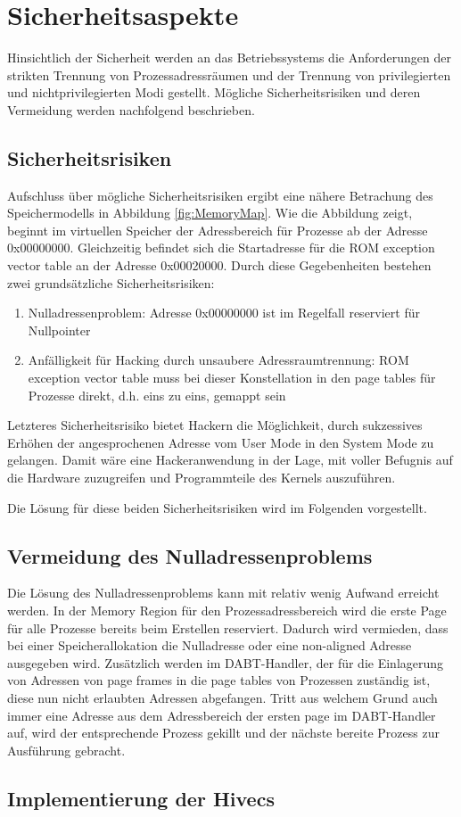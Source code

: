 \section{Sicherheitsaspekte}

Hinsichtlich der Sicherheit werden an das Betriebssystems die Anforderungen der strikten Trennung von Prozessadressräumen und der Trennung von privilegierten und nichtprivilegierten Modi gestellt. Mögliche Sicherheitsrisiken und deren Vermeidung werden nachfolgend beschrieben.

 

\subsection{Sicherheitsrisiken}

Aufschluss über mögliche Sicherheitsrisiken ergibt eine nähere Betrachung des Speichermodells in Abbildung \ref{fig:MemoryMap}. Wie die Abbildung zeigt, beginnt im virtuellen Speicher der Adressbereich für Prozesse ab der Adresse 0x00000000. Gleichzeitig befindet sich die Startadresse für die ROM exception vector table an der Adresse 0x00020000. Durch diese Gegebenheiten bestehen zwei grundsätzliche Sicherheitsrisiken:

\begin{enumerate}
	\item Nulladressenproblem: Adresse 0x00000000 ist im Regelfall reserviert für Nullpointer
	\item Anfälligkeit für Hacking durch unsaubere Adressraumtrennung: ROM exception vector table muss bei dieser Konstellation in den page tables für Prozesse direkt, d.h. eins zu eins, gemappt sein
\end{enumerate}

Letzteres Sicherheitsrisiko bietet Hackern die Möglichkeit, durch sukzessives Erhöhen der angesprochenen Adresse vom User Mode in den System Mode zu gelangen. Damit wäre eine Hackeranwendung in der Lage, mit voller Befugnis auf die Hardware zuzugreifen und Programmteile des Kernels auszuführen.

Die Lösung für diese beiden Sicherheitsrisiken wird im Folgenden vorgestellt.

\subsection{Vermeidung des Nulladressenproblems}

Die Lösung des Nulladressenproblems kann mit relativ wenig Aufwand erreicht werden. In der Memory Region für den Prozessadressbereich wird die erste Page für alle Prozesse bereits beim Erstellen reserviert. Dadurch wird vermieden, dass bei einer Speicherallokation die Nulladresse oder eine non-aligned Adresse ausgegeben wird. Zusätzlich werden im DABT-Handler, der für die Einlagerung von Adressen von page frames in die page tables von Prozessen zuständig ist, diese nun nicht erlaubten Adressen abgefangen. Tritt aus welchem Grund auch immer eine Adresse aus dem Adressbereich der ersten page im DABT-Handler auf, wird der entsprechende Prozess gekillt und der nächste bereite Prozess zur Ausführung gebracht.

\subsection{Implementierung der Hivecs}

\pagebreak 